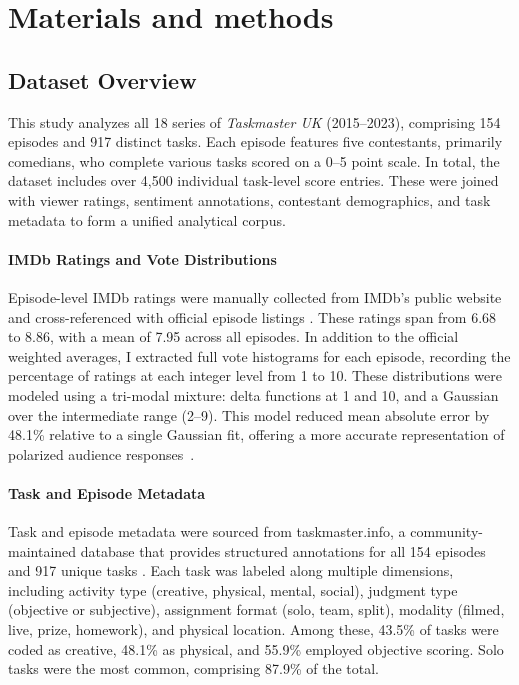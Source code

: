 \documentclass[10pt,letterpaper]{article}
\begin{document}
\section*{Materials and methods}


\subsection*{Dataset Overview}

This study analyzes all 18 series of \textit{Taskmaster UK} (2015–2023), comprising 154 episodes and 917 distinct tasks. Each episode features five contestants, primarily comedians, who complete various tasks scored on a 0–5 point scale. In total, the dataset includes over 4,500 individual task-level score entries. These were joined with viewer ratings, sentiment annotations, contestant demographics, and task metadata to form a unified analytical corpus.

\paragraph{IMDb Ratings and Vote Distributions}
Episode-level IMDb ratings were manually collected from IMDb’s public website and cross-referenced with official episode listings \cite{imdb}. These ratings span from 6.68 to 8.86, with a mean of 7.95 across all episodes. In addition to the official weighted averages, I extracted full vote histograms for each episode, recording the percentage of ratings at each integer level from 1 to 10. These distributions were modeled using a tri-modal mixture: delta functions at 1 and 10, and a Gaussian over the intermediate range (2–9). This model reduced mean absolute error by 48.1\% relative to a single Gaussian fit, offering a more accurate representation of polarized audience responses~\cite{McLachlan2000}.

\paragraph{Task and Episode Metadata}
Task and episode metadata were sourced from taskmaster.info, a community-maintained database that provides structured annotations for all 154 episodes and 917 unique tasks \cite{taskmasterinfo}. Each task was labeled along multiple dimensions, including activity type (creative, physical, mental, social), judgment type (objective or subjective), assignment format (solo, team, split), modality (filmed, live, prize, homework), and physical location. Among these, 43.5\% of tasks were coded as creative, 48.1\% as physical, and 55.9\% employed objective scoring. Solo tasks were the most common, comprising 87.9\% of the total.
\end{document}
